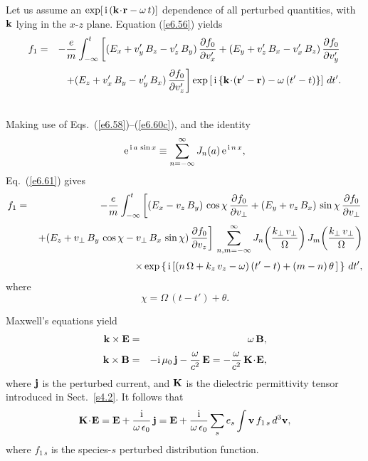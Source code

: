 Let us assume an $\exp[\,{\rm i}\,({\bf k}\!\cdot\!{\bf r} -\omega\,t)]$
dependence of all perturbed quantities, with ${\bf k}$ lying in the $x$-$z$ plane.
Equation (\ref{e6.56}) yields
\begin{eqnarray}\label{e6.61}
f_1& =& -\frac{e}{m}\int_{-\infty}^t \left[ (E_x + v_y'\,B_z - v_z'\,B_y)\,
\frac{\partial f_0}{\partial v_{x}'} +(E_y + v_z'\,B_x - v_x'\,B_z)\,
\frac{\partial f_0}{\partial v_{y}'} \right.\nonumber\\[0.5ex]
&&\left.+(E_z + v_x'\,B_y - v_y'\,B_x)\,
\frac{\partial f_0}{\partial v_{z}'} \right]\exp\left[\,{\rm i}\,\{{\bf k}\!\cdot\!
({\bf r}' -{\bf r})-\omega\,(t'-t)\}\right]\,dt'.\nonumber\\[0.5ex]&&
\end{eqnarray}
Making use of Eqs.~(\ref{e6.58})--(\ref{e6.60c}), and the identity
\begin{equation}
{\rm e}^{\,{\rm i}\,a\,\sin x} \equiv \sum_{n=-\infty}^{\infty}
J_n(a)\,{\rm e}^{\,{\rm i}\,n\,x},
\end{equation}
Eq.~(\ref{e6.61}) gives 
\begin{eqnarray}
f_1& =& -\frac{e}{m}\int_{-\infty}^t \left[ (E_x - v_z\,B_y)\,\cos\chi\,\frac{\partial f_0}{\partial v_\perp} + (E_y + v_z\,B_x)\,\sin\chi\,\frac{\partial f_0}{\partial v_\perp}
\right.\nonumber
\\[0.5ex]
&&\left.+(E_z+ v_\perp\,B_y\,\cos\chi - v_\perp\,B_x\,\sin\chi)\,\frac{\partial f_0}{\partial v_z} \right]\,\sum_{n,m=-\infty}^\infty J_n\!\left(\frac{k_\perp\,v_\perp}
{{\Omega}}\right)J_m\!\left(\frac{k_\perp\,v_\perp}
{{\Omega}}\right)\nonumber
\\[0.5ex]
&&\times \exp\left\{\,{\rm i}\left[(n\,{\Omega} + k_z\,v_z-\omega)
\,(t'-t) + (m-n)\,\theta\,\right]\,\right\}\,dt',\label{e6.63}
\end{eqnarray}
where
\begin{equation}
\chi = {\Omega}\,(t-t') + \theta.
\end{equation}

Maxwell's equations yield
\begin{eqnarray}
{\bf k}\times {\bf E} &=& \omega\,{\bf B},\\[0.5ex]
{\bf k}\times{\bf B} &=& -{\rm i}\,\mu_0\,{\bf j} - \frac{\omega}{c^2}\,{\bf E}
=-\frac{\omega}{c^2}\,{\bf K}\!\cdot\!{\bf E},
\end{eqnarray}
where ${\bf j}$ is the perturbed current, and ${\bf K}$ is the dielectric
permittivity tensor introduced in Sect.~\ref{s4.2}. It follows that
\begin{equation}\label{e6.66}
{\bf K}\!\cdot\!{\bf E} ={\bf E} + \frac{{\rm i}}{\omega\,\epsilon_0}
\,{\bf j}= {\bf E} + \frac{{\rm i}}{\omega\,\epsilon_0}
\sum_s e_s\int {\bf v}\,f_{1\,s}\,d^3{\bf v},
\end{equation}
where $f_{1\,s}$ is the species-$s$ perturbed distribution function.

